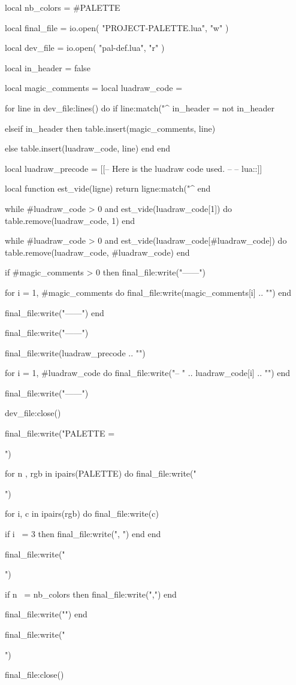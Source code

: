 
\begin{luacode*}
local nb_colors = #PALETTE

local final_file = io.open(
  "PROJECT-PALETTE.lua",
  "w"
)

local dev_file = io.open(
  "pal-def.lua",
  "r"
)

local in_header = false

local magic_comments = {}
local luadraw_code   = {}

for line in dev_file:lines() do
  if line:match("^%
    in_header = not in_header

  elseif in_header then
    table.insert(magic_comments, line)

  else
    table.insert(luadraw_code, line)
  end
end

local luadraw_precode = [[-- Here is the luadraw code used.
--
-- lua::]]

local function est_vide(ligne)
  return ligne:match("^%
end

while #luadraw_code > 0 and est_vide(luadraw_code[1]) do
  table.remove(luadraw_code, 1)
end

while #luadraw_code > 0 and est_vide(luadraw_code[#luadraw_code]) do
  table.remove(luadraw_code, #luadraw_code)
end

if #magic_comments > 0 then
  final_file:write("------\n")

  for i = 1, #magic_comments do
    final_file:write(magic_comments[i] .. "\n")
  end

  final_file:write("------\n\n")
end

final_file:write("------\n")

final_file:write(luadraw_precode .. "\n")

for i = 1, #luadraw_code do
  final_file:write("--     " .. luadraw_code[i] .. "\n")
end

final_file:write("------\n\n")

dev_file:close()

final_file:write("PALETTE = {\n")

for n , rgb in ipairs(PALETTE) do
  final_file:write("  {")

  for i, c in ipairs(rgb) do
    final_file:write(c)

    if i ~= 3 then
      final_file:write(", ")
    end
  end

  final_file:write("}")

  if n ~= nb_colors then
    final_file:write(",")
  end

  final_file:write("\n")
end

final_file:write("}\n")

final_file:close()
\end{luacode*}


